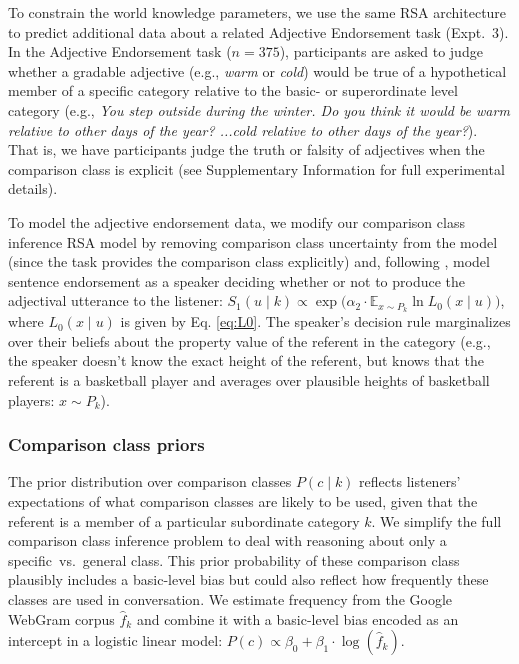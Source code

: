\documentclass[doc]{apa6}
\begin{document}
To constrain the world knowledge parameters, we use the same RSA architecture to predict additional data about a related Adjective Endorsement task (Expt.~3). 
In the Adjective Endorsement task ($n=375$), participants are asked to judge whether a gradable adjective (e.g., \emph{warm} or \emph{cold}) would be true of a hypothetical member of a specific category relative to the basic- or superordinate level category (e.g., \emph{You step outside during the winter. Do you think it would be warm relative to other days of the year? ...cold relative to other days of the year?}). 
That is, we have participants judge the truth or falsity of adjectives when the comparison class is explicit (see Supplementary Information for full experimental details).

To model the adjective endorsement data, we modify our comparison class inference RSA model by removing comparison class uncertainty from the model (since the task provides the comparison class explicitly) and, following , model sentence endorsement as a speaker deciding whether or not to produce the adjectival utterance to the listener: $S_{1}(u \mid k) \propto \exp{(\alpha_2 \cdot {\mathbb E}_{x\sim P_{k}}} \ln{L_0(x \mid u)})$, where $L_0(x \mid u)$ is given by Eq. \ref{eq:L0}. 
The speaker's decision rule marginalizes over their beliefs about the property value of the referent in the category (e.g., the speaker doesn't know the exact height of the referent, but knows that the referent is a basketball player and averages over plausible heights of basketball players: $x\sim P_{k}$).

\subsubsection{Comparison class priors}

The prior distribution over comparison classes $P(c \mid k)$ reflects listeners' expectations of what comparison classes are likely to be used, given that the referent is a member of a particular subordinate category $k$.
We simplify the full comparison class inference problem to deal with reasoning about only a specific~vs.~general class.
This prior probability of these comparison class plausibly includes a basic-level bias \cite{rosch1975family} but could also reflect how frequently these classes are used in conversation.
We estimate frequency from the Google WebGram corpus $\hat{f}_k$ and combine it with a basic-level bias encoded as an intercept in a logistic linear model: $P(c) \propto \beta_0 + \beta_1 \cdot \log (\hat{f}_k)$.
\end{document}
